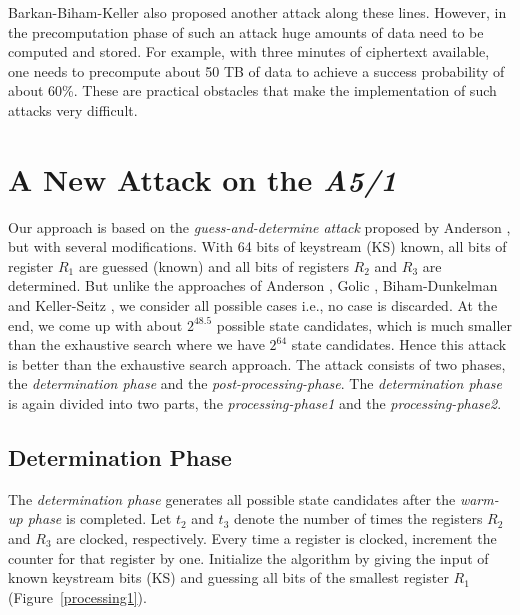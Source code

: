 \documentclass{llncs}
\begin{document}
Barkan-Biham-Keller \cite{[Bar]} also proposed another attack along these lines.  However, in the precomputation phase of such an attack huge amounts of data need to be computed and stored. For example, with three minutes of ciphertext available, one needs to precompute about 50 TB of data to achieve a success probability of about 60\%. These are practical obstacles that make the implementation of such attacks very difficult.


\section{A New Attack on the \emph{A5/1}}
Our approach is based on the \emph{guess-and-determine attack} proposed by Anderson \cite{[And]}, but with several modifications. With 64 bits of keystream (KS) known, all bits of register $R_{1}$ are guessed (known) and all bits of registers $R_{2}$ and $R_{3}$ are determined. But unlike the approaches of Anderson \cite{[And]}, Golic \cite{[Golic]}, Biham-Dunkelman \cite{[BD]} and Keller-Seitz \cite{[KS01]}, we consider all possible cases i.e., no case is discarded. At the end, we come up with about $2^{48.5}$ possible state candidates, which is much smaller than the exhaustive search where we have $2^{64}$ state candidates. Hence this attack is better than the exhaustive search approach. \newline\newline The attack consists of two phases, the \emph{determination phase} and the \emph{post-processing-phase}. The \emph{determination phase} is again divided into two parts, the \emph{processing-phase1} and the \emph{processing-phase2}.

\subsection{Determination Phase} 
The \emph{determination phase} generates all possible state candidates after the \emph{warm-up phase} \cite{[Bri]} is completed. 
Let $t_2$ and $t_3$ denote the number of times the registers $R_{2}$ and $R_{3}$ are clocked, respectively. Every time a register is clocked, increment the counter for that register by one. Initialize the algorithm by giving the input of known keystream bits (KS) and guessing all bits of the smallest register $R_{1}$ (Figure~\ref{processing1}).
\end{document}
